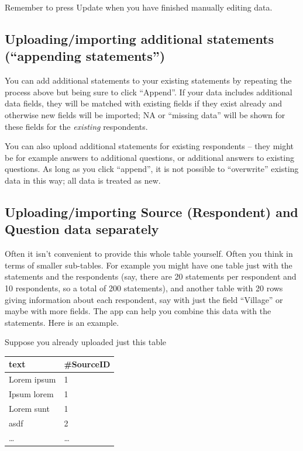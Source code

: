 \documentclass[
]{book}
\begin{document}
Remember to press Update when you have finished manually editing data.

\hypertarget{uploadingimporting-additional-statements-appending-statements}{%
\subsection{Uploading/importing additional statements (``appending statements'')}\label{uploadingimporting-additional-statements-appending-statements}}

You can add additional statements to your existing statements by repeating the process above but being sure to click ``Append''. If your data includes additional data fields, they will be matched with existing fields if they exist already and otherwise new fields will be imported; NA or ``missing data'' will be shown for these fields for the \emph{existing} respondents.

You can also upload additional statements for existing respondents -- they might be for example answers to additional questions, or additional answers to existing questions. As long as you click ``append'', it is not possible to ``overwrite'' existing data in this way; all data is treated as new.

\hypertarget{uploadingimporting-source-respondent-and-question-data-separately}{%
\subsection{Uploading/importing Source (Respondent) and Question data separately}\label{uploadingimporting-source-respondent-and-question-data-separately}}

Often it isn't convenient to provide this whole table yourself. Often you think in terms of smaller sub-tables. For example you might have one table just with the statements and the respondents (say, there are 20 statements per respondent and 10 respondents, so a total of 200 statements), and another table with 20 rows giving information about each respondent, say with just the field ``Village'' or maybe with more fields. The app can help you combine this data with the statements. Here is an example.

Suppose you already uploaded just this table

\begin{longtable}[]{@{}ll@{}}
\toprule
\textbf{text} & \textbf{\#SourceID}\tabularnewline
\midrule
\endhead
Lorem ipsum & 1\tabularnewline
Ipsum lorem & 1\tabularnewline
Lorem sunt & 1\tabularnewline
asdf & 2\tabularnewline
\ldots{} & \ldots{}\tabularnewline
\bottomrule
\end{longtable}
\end{document}
